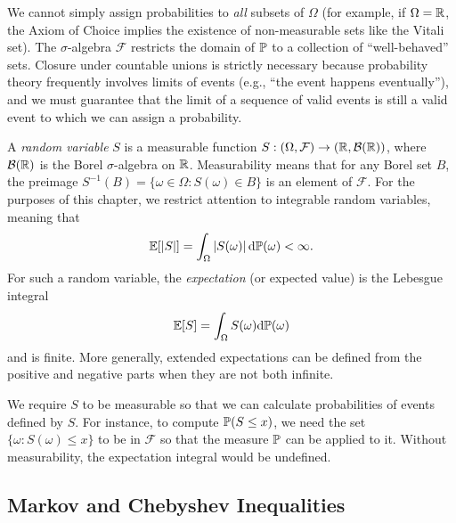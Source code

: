 \begin{remark}
We cannot simply assign probabilities to \textit{all} subsets of $\Omega$ (for example, if $\Omega = \mathbb{R}$, the Axiom of Choice implies the existence of non-measurable sets like the Vitali set). The $\sigma$-algebra $\mathcal{F}$ restricts the domain of $\mathbb{P}$ to a collection of ``well-behaved'' sets. Closure under countable unions is strictly necessary because probability theory frequently involves limits of events (e.g., ``the event happens eventually''), and we must guarantee that the limit of a sequence of valid events is still a valid event to which we can assign a probability.
\end{remark}

\begin{definition}
A \textit{random variable} $S$ is a measurable function $S: (\Omega, \mathcal{F}) \to (\mathbb{R}, \mathcal{B}(\mathbb{R}))$, where $\mathcal{B}(\mathbb{R})$ is the Borel $\sigma$-algebra on $\mathbb{R}$. Measurability means that for any Borel set $B$, the preimage $S^{-1}(B) = \{\omega \in \Omega : S(\omega) \in B\}$ is an element of $\mathcal{F}$.
For the purposes of this chapter, we restrict attention to integrable
random variables, meaning that
\[
\operatorname{\mathbb{E}}[|S|]=\int_\Omega |S(\omega)|\,\mathrm{d}\mathbb{P}(\omega)<\infty.
\]
For such a random variable, the \textit{expectation} (or expected value)
is the Lebesgue integral
\begin{equation}
\operatorname{\mathbb{E}}[S] = \int_\Omega S(\omega) \mathrm{d} \mathbb{P}(\omega)
\end{equation}
and is finite. More generally, extended expectations can be defined from
the positive and negative parts when they are not both infinite.
\end{definition}

\begin{remark}
We require $S$ to be measurable so that we can calculate probabilities of events defined by $S$. For instance, to compute $\mathbb{P}(S \leq x)$, we need the set $\{\omega : S(\omega) \leq x\}$ to be in $\mathcal{F}$ so that the measure $\mathbb{P}$ can be applied to it. Without measurability, the expectation integral would be undefined.
\end{remark}



\subsection{Markov and Chebyshev Inequalities}

